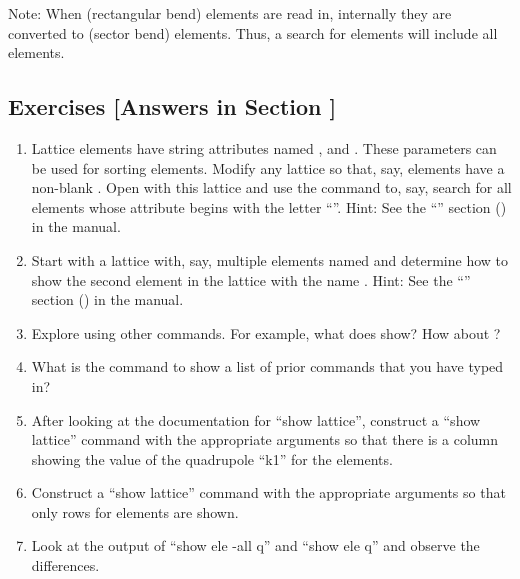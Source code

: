 \documentclass{hitec}     %
\begin{document}
Note: When  (rectangular bend) elements are read in, internally they are converted to
 (sector bend) elements. Thus, a search for  elements will include all
 elements.

\subsection{Exercises [Answers in Section ]}
\label{s:show.ex}

\begin{enumerate}[label=\thesection.\arabic{enumi}]
\item
Lattice elements have string attributes named ,  and . These
parameters can be used for sorting elements. Modify any lattice so that, say, elements have a
non-blank . Open \tao with this lattice and use the  command to, say,
search for all elements whose  attribute begins with the letter ``''. Hint: See
the ``''
section () in the \bmad manual.
%
\item
Start \tao with a lattice with, say, multiple elements named  and determine how to show the
second element in the lattice with the name . Hint: See the ``'' section () in the \bmad manual.
%
\item 
Explore using other  commands. For example, what does  show? How about
?
%
\item 
What is the command to show a list of prior commands that you have typed in?
%
\item
After looking at the documentation for ``show lattice'', construct a ``show lattice'' command with
the appropriate arguments so that there is a column showing the value of the quadrupole ``k1'' for
the elements.
%
\item
Construct a ``show lattice'' command with the appropriate arguments so that only rows for 
elements are shown.
%
\item
Look at the output of ``show ele -all q'' and ``show ele q'' and observe the differences.

\end{enumerate}

\newpage
\end{document}
